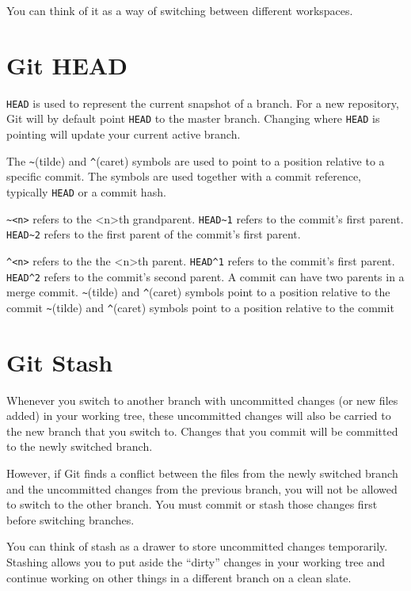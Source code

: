 \documentclass[10pt,a4paper,english]{report}
\begin{document}
    You can think of it as a way of switching between different workspaces.

    \section{Git HEAD}

    \verb|HEAD| is used to represent the current snapshot of a branch. For a new repository, Git will by default point \verb|HEAD| to the master branch. Changing where \verb|HEAD| is pointing will update your current active branch.

    The \verb|~|(tilde) and \verb|^|(caret) symbols are used to point to a position relative to a specific commit. The symbols are used together with a commit reference, typically \verb|HEAD| or a commit hash.

    \verb|~<n>| refers to the <n>th grandparent. \verb|HEAD~1| refers to the commit's first parent. \verb|HEAD~2| refers to the first parent of the commit's first parent.

    \verb|^<n>| refers to the the <n>th parent. \verb|HEAD^1| refers to the commit's first parent. \verb|HEAD^2| refers to the commit's second parent. A commit can have two parents in a merge commit.
    \verb|~|(tilde) and \verb|^|(caret) symbols point to a position relative to the commit
    \verb|~|(tilde) and \verb|^|(caret) symbols point to a position relative to the commit

    \section{Git Stash}

    Whenever you switch to another branch with uncommitted changes (or new files added) in your working tree, these uncommitted changes will also be carried to the new branch that you switch to. Changes that you commit will be committed to the newly switched branch.

    However, if Git finds a conflict between the files from the newly switched branch and the uncommitted changes from the previous branch, you will not be allowed to switch to the other branch. You must commit or stash those changes first before switching branches.

    You can think of stash as a drawer to store uncommitted changes temporarily. Stashing allows you to put aside the “dirty” changes in your working tree and continue working on other things in a different branch on a clean slate.
\end{document}
